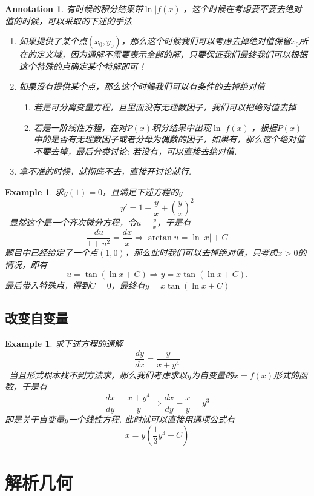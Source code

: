 \documentclass{article}
\newtheorem{example}[theorem]{Example}
\newtheorem{annotation}[theorem]{Annotation}
\newcommand{\hints}{{\color{blue} \text{hints}}}
\begin{document}
\begin{annotation}
\rm 有时候的积分结果带$\ln|f(x)|$，这个时候在考虑要不要去绝对值的时候，可以采取的下述的手法
\begin{enumerate}
	\item 如果提供了某个点$(x_0,y_0)$，那么这个时候我们可以考虑去掉绝对值保留$x_0$所在的定义域，因为通解不需要表示全部的解，只要保证我们最终我们可以根据这个特殊的点确定某个特解即可！
	\item 如果没有提供某个点，那么这个时候我们可以有条件的去掉绝对值
	\begin{enumerate}
		\item 若是可分离变量方程，且里面没有无理数因子，我们可以把绝对值去掉
		\item 若是一阶线性方程，在对$P(x)$积分结果中出现$\ln|f(x)|$，根据$P(x)$中的是否有无理数因子或者分母为偶数的因子，如果有，那么这个绝对值不要去掉，最后分类讨论; 若没有，可以直接去绝对值. 
	\end{enumerate}
	\item 拿不准的时候，就彻底不去，直接开讨论就行. 
\end{enumerate}	
\end{annotation}

\begin{example}
\rm 求$y(1)=0$，且满足下述方程的$y$
$$
y'  = 1+\frac{y}{x} + \left( \frac{y}{x} \right)^2
$$
\hints\ 显然这个是一个齐次微分方程，令$u = \frac{y}{x}$，于是有
$$
\frac{du}{1+u^2} = \frac{dx}{x} \Rightarrow \arctan u = \ln |x|+C
$$
题目中已经给定了一个点$(1,0)$，那么此时我们可以去掉绝对值，只考虑$x > 0$的情况，即有
$$
u = \tan (\ln x + C) \Rightarrow y = x\tan (\ln x + C).
$$
最后带入特殊点，得到$C = 0$，最终有$y = x\tan (\ln x + C)$
\end{example}


\subsection{改变自变量}

\begin{example}
\rm 求下述方程的通解
$$
\frac{dy}{dx} = \frac{y}{x+y^4}
$$
\hints\ 当且形式根本找不到方法求，那么我们考虑求以$y$为自变量的$x=f(x)$形式的函数，于是有
$$
\frac{dx}{dy} = \frac{x+y^4}{y}  \Rightarrow \frac{dx}{dy} - \frac{x}{y} = y^3
$$
即是关于自变量$y$一个线性方程. 此时就可以直接用通项公式有
$$
x= y(\frac{1}{3}y^3 + C)
$$
\end{example}

\newpage
\section{解析几何}
\end{document}
